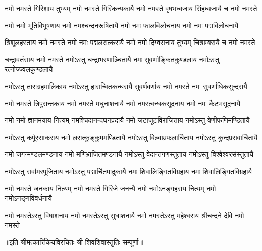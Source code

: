 
\begin{AutoCols}[\maxColumns]
\fourlineindentedshloka
{नमो नमस्ते गिरिशाय तुभ्यम्}
{नमो नमस्ते गिरिकन्यकायै}
{नमो नमस्ते वृषभध्वजाय}
{सिंहध्वजायै च नमो नमस्ते}

\fourlineindentedshloka
{नमो नमो भूतिविभूषणाय}
{नमो नमश्चन्दनरूषितायै}
{नमो नमः फालविलोचनाय}
{नमो नमः पद्मविलोचनायै}

\fourlineindentedshloka
{त्रिशूलहस्ताय नमो नमस्ते}
{नमो नमः पद्मलसत्करायै}
{नमो नमो दिग्वसनाय तुभ्यम्}
{चित्राम्बरायै च नमो नमस्ते}

\fourlineindentedshloka
{चन्द्रावतंसाय नमो नमस्ते}
{नमोऽस्तु चन्द्राभरणाञ्चितायै}
{नमः सुवर्णाङ्कितकुण्डलाय}
{नमोऽस्तु रत्नोज्ज्वलकुण्डलायै}

\fourlineindentedshloka
{नमोऽस्तु ताराग्रहमालिकाय}
{नमोऽस्तु हारान्वितकन्धरायै}
{सुवर्णवर्णाय नमो नमस्ते}
{नमः सुवर्णाधिकसुन्दरायै}

\fourlineindentedshloka
{नमो नमस्ते त्रिपुरान्तकाय}
{नमो नमस्ते मधुनाशनायै}
{नमो नमस्त्वन्धकसूदनाय}
{नमो नमः कैटभसूदनायै}

\fourlineindentedshloka
{नमो नमो ज्ञानमयाय नित्यम्}
{नमश्चिदानन्दघनप्रदायै}
{नमो जटाजूटविराजिताय}
{नमोऽस्तु वेणीफणिमण्डितायै}

\fourlineindentedshloka
{नमोऽस्तु कर्पूरसाकराय}
{नमो लसत्कुङ्कुममण्डितायै}
{नमोऽस्तु बिल्वाम्रफलार्चिताय}
{नमोऽस्तु कुन्दप्रसवार्चितायै}

\fourlineindentedshloka
{नमो जगन्मण्डलमण्डनाय}
{नमो मणिभ्राजितमण्डनायै}
{नमोऽस्तु वेदान्तगणस्तुताय}
{नमोऽस्तु विश्वेश्वरसंस्तुतायै}

\fourlineindentedshloka
{नमोऽस्तु सर्वामरपूजिताय}
{नमोऽस्तु पद्मार्चितपादुकायै}
{नमः शिवालिङ्गितविग्रहाय}
{नमः शिवालिङ्गितविग्रहायै}

\fourlineindentedshloka
{नमो नमस्ते जनकाय नित्यम्}
{नमो नमस्ते गिरिजे जनन्यै}
{नमो नमोऽनङ्गहराय नित्यम्}
{नमो नमोऽनङ्गविवर्धनायै}

\fourlineindentedshloka
{नमो नमस्तेऽस्तु विषाशनाय}
{नमो नमस्तेऽस्तु सुधाशनायै}
{नमो नमस्तेऽस्तु महेश्वराय}
{श्रीचन्दने देवि नमो नमस्ते}
\end{AutoCols}
॥इति श्रीमत्कार्त्तिकेयविरचितः श्री-शिवशिवास्तुतिः सम्पूर्णा॥